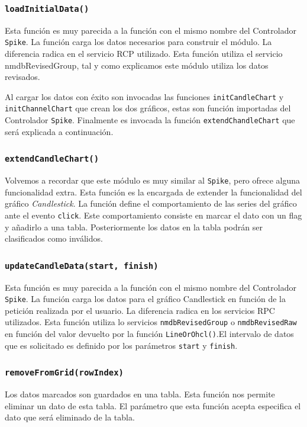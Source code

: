 		\subsubsection{\texttt{loadInitialData()}}
			Esta función es muy parecida a la función con el mismo nombre del Controlador \texttt{Spike}. La función carga los datos
			necesarios para construir el módulo. La diferencia radica en el servicio RCP utilizado. Esta función utiliza el servicio
			nmdbRevisedGroup, tal y como explicamos este módulo utiliza los datos revisados.
			\par
			Al cargar los datos con éxito son invocadas las funciones \texttt{initCandleChart} y \texttt{initChannelChart} que crean los
			dos gráficos, estas son función importadas del Controlador \texttt{Spike}. Finalmente es invocada la función
			\texttt{extendChandleChart} que será explicada a continuación.
		\subsubsection{\texttt{extendCandleChart()}}
			Volvemos a recordar que este módulo es muy similar al \texttt{Spike}, pero ofrece alguna funcionalidad extra. Esta función es
			la encargada de extender la funcionalidad del gráfico \emph{Candlestick}. La función define el comportamiento de las series
			del gráfico ante el evento \texttt{click}. Este comportamiento consiste en marcar el dato con un flag y añadirlo a una tabla.
			Posteriormente los datos en la tabla podrán ser clasificados como inválidos. 
		\subsubsection{\texttt{updateCandleData(start, finish)}}
			Esta función es muy parecida a la función con el mismo nombre del Controlador \texttt{Spike}. La función carga los datos para
			el gráfico Candlestick en función de la petición realizada por el usuario. La diferencia radica en los servicios RPC
			utilizados. Esta función utiliza lo servicios \texttt{nmdbRevisedGroup} o \texttt{nmdbRevisedRaw} en función del valor
			devuelto por la función \texttt{LineOrOhcl()}.El intervalo de datos que es solicitado es definido por los parámetros
			\texttt{start} y \texttt{finish}.
		\subsubsection{\texttt{removeFromGrid(rowIndex)}}
			Los datos marcados son guardados en una tabla. Esta función nos permite eliminar un dato de esta tabla. El parámetro que esta
			función acepta especifica el dato que será eliminado de la tabla. 

